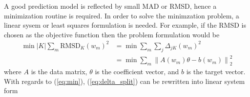 \documentclass[12pt]{article}
\begin{document}
A good prediction model is reflected by small MAD or RMSD, hence a minimization routine is required. In order to solve the minimzation problem, a linear sysem or least squares formulation is needed. For example, if the RMSD is chosen as the objective function then the problem formulation would be
\begin{equation}
    \label{eq:min}
    \begin{split}
        \min |K| \sum_m \text{RMSD}_K(w_m)^2 &= \min \sum_m \sum_j \Delta_{jK}(w_m)^2 \\
        &= \min \sum_m \left\| A(w_m)\theta - b(w_m)\right\|_2^2
    \end{split}
\end{equation}
where $A$ is the data matrix, $\theta$ is the coefficient vector, and $b$ is the target vector.
With regards to (\ref{eq:min}), (\ref{eq:delta_split}) can be rewritten into linear system form
\end{document}
